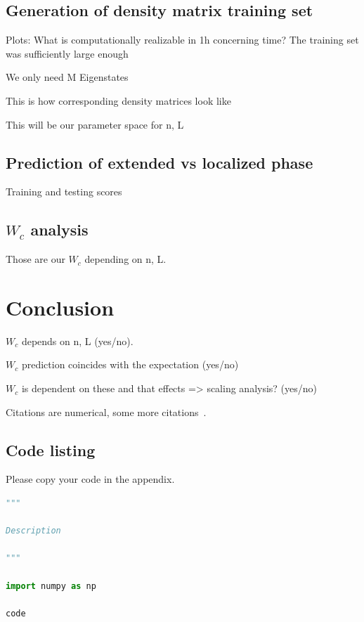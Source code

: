\documentclass[reprint,amsmath,amssymb,aps,prb]{revtex4-2}
\begin{document}
\subsection{Generation of density matrix training set}

Plots: 
What is computationally realizable in 1h concerning time?
The training set was sufficiently large enough 

We only need M Eigenstates

This is how corresponding density matrices look like

This will be our parameter space for n, L

\subsection{Prediction of extended vs localized phase}

Training and testing scores

\subsection{$W_c$ analysis}

Those are our $W_c$ depending on n, L.

\section{Conclusion}%

$W_c$ depends on n, L (yes/no).

$W_c$ prediction coincides with the expectation (yes/no)

$W_c$ is dependent on these and that effects => scaling analysis? (yes/no)

Citations are numerical\cite{epr}, some more citations~\cite{feyn54,Bire82,Berman1983,witten2001,Davies1998}. 




\appendix


\begin{widetext}
\section{Code listing} \label{app:codes}
Please copy your code in the appendix.
\begin{lstlisting}[language=Python]
"""

Description

"""

import numpy as np

code
\end{lstlisting}
\end{widetext}
\end{document}
